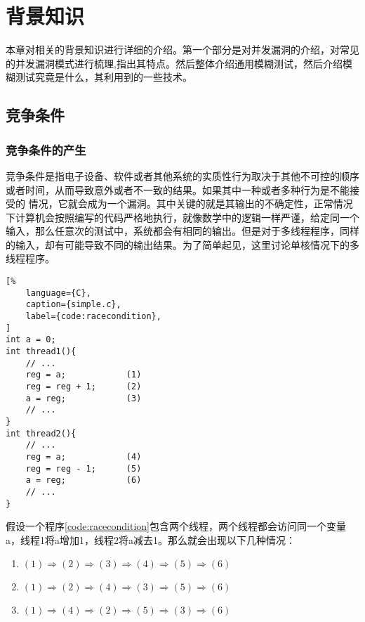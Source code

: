 \section{背景知识}



本章对相关的背景知识进行详细的介绍。第一个部分是对并发漏洞的介绍，对常见的并发漏洞模式进行梳理,指出其特点。然后整体介绍通用模糊测试，然后介绍模糊测试究竟是什么，其利用到的一些技术。

\subsection{竞争条件}

\subsubsection{竞争条件的产生}

竞争条件是指电子设备、软件或者其他系统的实质性行为取决于其他不可控的顺序或者时间，从而导致意外或者不一致的结果。如果其中一种或者多种行为是不能接受的 情况，它就会成为一个漏洞。其中关键的就是其输出的不确定性，正常情况下计算机会按照编写的代码严格地执行，就像数学中的逻辑一样严谨，给定同一个输入，那么任意次的测试中，系统都会有相同的输出。但是对于多线程程序，同样的输入，却有可能导致不同的输出结果。为了简单起见，这里讨论单核情况下的多线程程序。

\begin{spacing}{1.0}
\begin{lstlisting}[%
    language={C},
    caption={simple.c},
    label={code:racecondition},
]
int a = 0;
int thread1(){
    // ...
    reg = a;            (1)
    reg = reg + 1;      (2)
    a = reg;            (3)
    // ...
}
int thread2(){
    // ...
    reg = a;            (4)
    reg = reg - 1;      (5)
    a = reg;            (6)
    // ...
}
\end{lstlisting}
\end{spacing}

假设一个程序\autoref{code:racecondition}包含两个线程，两个线程都会访问同一个变量a，线程1将a增加1，线程2将a减去1。那么就会出现以下几种情况：

\begin{enumerate}
\item $(1) \Rightarrow (2) \Rightarrow (3) \Rightarrow (4) \Rightarrow (5) \Rightarrow (6)$
\item $(1) \Rightarrow (2) \Rightarrow (4) \Rightarrow (3) \Rightarrow (5) \Rightarrow (6)$
\item $(1) \Rightarrow (4) \Rightarrow (2) \Rightarrow (5) \Rightarrow (3) \Rightarrow (6)$
\end{enumerate}

